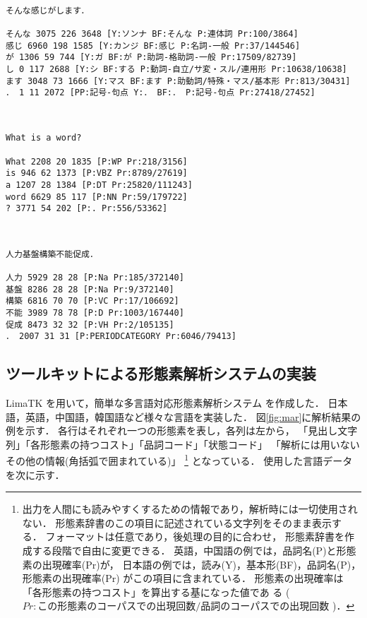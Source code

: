 \begin{figure*}[htb]

  \baselineskip 3.9mm
 ~ 
\begin{verbatim}
そんな感じがします．

そんな 3075 226 3648 [Y:ソンナ BF:そんな P:連体詞 Pr:100/3864]
感じ 6960 198 1585 [Y:カンジ BF:感じ P:名詞-一般 Pr:37/144546]
が 1306 59 744 [Y:ガ BF:が P:助詞-格助詞-一般 Pr:17509/82739]
し 0 117 2688 [Y:シ BF:する P:動詞-自立/サ変・スル/連用形 Pr:10638/10638]
ます 3048 73 1666 [Y:マス BF:ます P:助動詞/特殊・マス/基本形 Pr:813/30431]
． 1 11 2072 [PP:記号-句点 Y:． BF:． P:記号-句点 Pr:27418/27452]
\end{verbatim}

\bigskip

 ~ 
\begin{verbatim}
What is a word?

What 2208 20 1835 [P:WP Pr:218/3156]
is 946 62 1373 [P:VBZ Pr:8789/27619]
a 1207 28 1384 [P:DT Pr:25820/111243]
word 6629 85 117 [P:NN Pr:59/179722]
? 3771 54 202 [P:. Pr:556/53362]
\end{verbatim}

\bigskip

 ~
\begin{verbatim}
人力基盤構築不能促成．

人力 5929 28 28 [P:Na Pr:185/372140]
基盤 8286 28 28 [P:Na Pr:9/372140]
構築 6816 70 70 [P:VC Pr:17/106692]
不能 3989 78 78 [P:D Pr:1003/167440]
促成 8473 32 32 [P:VH Pr:2/105135]
． 2007 31 31 [P:PERIODCATEGORY Pr:6046/79413]
\end{verbatim}




  \caption{形態素解析例}\label{fig:mar}
\end{figure*}


\subsection{ツールキットによる形態素解析システムの実装}\label{comp:moz}

LimaTK を用いて，簡単な多言語対応形態素解析システム \moz を作成した．
日本語，英語，中国語，韓国語など様々な言語を実装した．
図\ref{fig:mar}に解析結果の例を示す．
各行はそれぞれ一つの形態素を表し，各列は左から，
「見出し文字列」「各形態素の持つコスト」「品詞コード」「状態コード」
「解析には用いないその他の情報(角括弧で囲まれている)」
\footnote{
  出力を人間にも読みやすくするための情報であり，解析時には一切使用されない．
  形態素辞書のこの項目に記述されている文字列をそのまま表示する．
  フォーマットは任意であり，後処理の目的に合わせ，
  形態素辞書を作成する段階で自由に変更できる．
  英語，中国語の例では，品詞名(P)と形態素の出現確率(Pr)が，
  日本語の例では，読み(Y)，基本形(BF)，品詞名(P)，形態素の出現確率(Pr)
  がこの項目に含まれている．
  形態素の出現確率は「各形態素の持つコスト」を算出する基になった値であ
  る
  (
  $Pr:この形態素のコーパスでの出現回数/品詞のコーパスでの出現回数$
  )．
}
となっている．
使用した言語データを次に示す．

